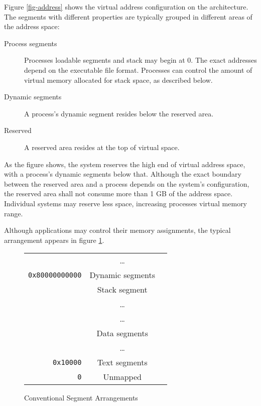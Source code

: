 Figure \ref{fig-address} shows the virtual address configuration on the \xARCH
architecture.  The segments with different properties are typically grouped in
different areas of the address space:

\begin{description}
  \item [Process segments]
    Processes loadable segments and stack may begin at 0. The exact addresses
    depend on the executable file format. Processes can control the amount
    of virtual memory allocated for stack space, as described below.
  \item [Dynamic segments]
    A process's dynamic segment resides below the reserved area.
  \item [Reserved] A reserved area resides at the top of virtual space.
\end{description}

As the figure shows, the system reserves the high end of virtual address space,
with a process's dynamic segments below that. Although the exact boundary
between the reserved area and a process depends on the system's configuration,
the reserved area shall not consume more than 1 GB of the address space.
Individual systems may reserve less space, increasing processes  virtual memory
range.

Although applications may control their memory assignments, the typical
arrangement appears in figure \ref{fig-cfg}.

\begin{figure}[H]
\Hrule
  \caption{Conventional Segment Arrangements}
  \label{fig-cfg}
  \begin{center}
    \begin{tabular}{r|c|l}
      \cline{2-2}
      & \dots & \\
      \verb|0x80000000000| & Dynamic segments & \\ \cline{2-2}
      & Stack segment & \\ 
      & \dots & \\ \cline{2-2}
      & \dots & \\
      & Data segments & \\ \cline{2-2}
      & \dots & \\
      \verb|0x10000| & Text segments & \\ \cline{2-2}
      \verb|0| & Unmapped & \\ \cline{2-2}
    \end{tabular}
  \end{center}
\Hrule
\end{figure}

